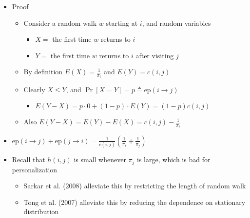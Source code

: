 \documentclass{article}
\begin{document}
\begin{itemize}
\item Proof
\begin{itemize}
\item Consider a random walk $w$ starting at $i$, and random variables
\begin{itemize}
\item $X = $ the first time $w$ returns to $i$
\item $Y = $ the first time $w$ returns to $i$ after visiting $j$
\end{itemize}
\item By definition $E(X) = \frac{1}{\pi_i}$ and $E(Y) = c(i,j)$
\item Clearly $X \leq Y$, and $\Pr\left[X = Y\right] = p \triangleq \mathrm{ep}(i\rightarrow j)$
\begin{itemize}
\item $E(Y - X) = p\cdot 0 + (1 - p)\cdot E(Y) = (1-p) c(i,j)$
\end{itemize}
\item Also $E(Y - X) = E(Y) - E(X) = c(i,j) - \frac{1}{\pi_i}$
\end{itemize}
\end{itemize}

\begin{itemize}
\item $\mathrm{ep}(i\rightarrow j) + \mathrm{ep}(j\rightarrow i) = \frac{1}{c(i,j)}\left(\frac{1}{\pi_i} + \frac{1}{\pi_j}\right)$
\item Recall that $h(i,j)$ is small whenever $\pi_j$ is large, which is bad for personalization
\begin{itemize}
\item Sarkar et al. (2008) alleviate this by restricting the length of random walk
\item Tong et al. (2007) alleviate this by reducing the dependence on stationary distribution
\end{itemize}
\end{itemize}
\end{document}
